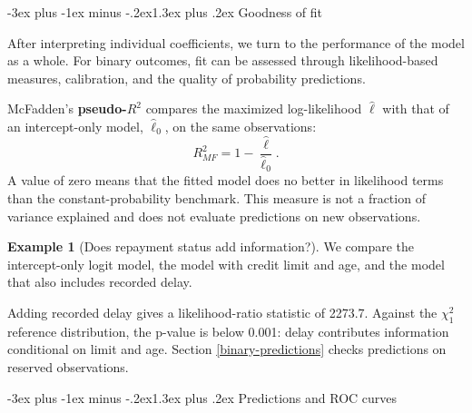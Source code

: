 \documentclass[
  11pt,
]{book}
\makeatletter
\renewcommand\section{\@startsection{section}{1}{\z@}
  {-3ex plus -1ex minus -.2ex}{1.3ex plus .2ex}
  {\normalfont\Large\bfseries\color{TextbookInk}}}
\theoremstyle{definition}
\theoremstyle{definition}
\newtheorem{example}{Example}[chapter]
\theoremstyle{definition}
\theoremstyle{definition}
\theoremstyle{remark}
\makeatother
\begin{document}
\section{Goodness of fit}\label{binary-fit}

After interpreting individual coefficients, we turn to the performance of the model as a whole. For binary outcomes, fit can be assessed through likelihood-based measures, calibration, and the quality of probability predictions.

McFadden's \textbf{pseudo-\(R^2\)} compares the maximized log-likelihood \(\widehat\ell\) with that of an intercept-only model, \(\widehat\ell_0\), on the same observations:
\[
R^2_{MF}=1-\frac{\widehat\ell}{\widehat\ell_0}.
\]
A value of zero means that the fitted model does no better in likelihood terms than the constant-probability benchmark. This measure is not a fraction of variance explained and does not evaluate predictions on new observations.

\begin{example}[Does repayment status add information?]
\protect\hypertarget{exm:credit-binary-fit}{}\label{exm:credit-binary-fit}We compare the intercept-only logit model, the model with credit limit and age, and the model that also includes recorded delay.

\begin{table}[H]
\centering
\caption{\label{tab:credit-binary-fit}Within-sample fit of nested logit specifications.}
\centering
{}
\end{table}

Adding recorded delay gives a likelihood-ratio statistic of 2273.7. Against the \(\chi^2_1\) reference distribution, the p-value is below 0.001: delay contributes information conditional on limit and age. Section \ref{binary-predictions} checks predictions on reserved observations.
\end{example}

\section{Predictions and ROC curves}\label{binary-predictions}
\end{document}
